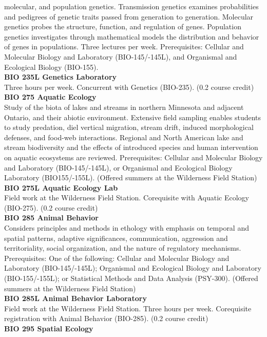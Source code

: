 \documentclass[
  letterpaper,
]{scrbook}
\begin{document}
molecular, and population genetics. Transmission genetics examines
probabilities and pedigrees of genetic traits passed from generation to
generation. Molecular genetics probes the structure, function, and
regulation of genes. Population genetics investigates through
mathematical models the distribution and behavior of genes in
populations. Three lectures per week. Prerequisites: Cellular and
Molecular Biology and Laboratory (BIO-145/-145L), and Organismal and
Ecological Biology (BIO-155).\\
\textbf{BIO 235L Genetics Laboratory}\\
Three hours per week. Concurrent with Genetics (BIO-235). (0.2 course
credit)\\
\textbf{BIO 275 Aquatic Ecology}\\
Study of the biota of lakes and streams in northern Minnesota and
adjacent Ontario, and their abiotic environment. Extensive field
sampling enables students to study predation, diel vertical migration,
stream drift, induced morphological defenses, and food-web interactions.
Regional and North American lake and stream biodiversity and the effects
of introduced species and human intervention on aquatic ecosystems are
reviewed. Prerequisites: Cellular and Molecular Biology and Laboratory
(BIO-145/-145L), or Organismal and Ecological Biology Laboratory
(BIO155/-155L). (Offered summers at the Wilderness Field Station)\\
\textbf{BIO 275L Aquatic Ecology Lab}\\
Field work at the Wilderness Field Station. Corequisite with Aquatic
Ecology (BIO-275). (0.2 course credit)\\
\textbf{BIO 285 Animal Behavior}\\
Considers principles and methods in ethology with emphasis on temporal
and spatial patterns, adaptive significances, communication, aggression
and territoriality, social organization, and the nature of regulatory
mechanisms. Prerequisites: One of the following: Cellular and Molecular
Biology and Laboratory (BIO-145/-145L); Organismal and Ecological
Biology and Laboratory (BIO-155/-155L); or Statistical Methods and Data
Analysis (PSY-300). (Offered summers at the Wilderness Field Station)\\
\textbf{BIO 285L Animal Behavior Laboratory}\\
Field work at the Wilderness Field Station. Three hours per week.
Corequisite registration with Animal Behavior (BIO-285). (0.2 course
credit)\\
\textbf{BIO 295 Spatial Ecology}\\
\end{document}

